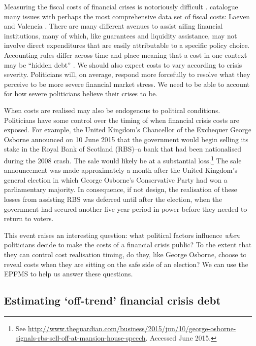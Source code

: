 \documentclass[]{article}
\begin{document}
Measuring the fiscal costs of financial crises is notoriously difficult \citep[see][]{reinhartRogoff2011}. \cite{GandrudHallerberg2015} catalogue many issues with perhaps the most comprehensive data set of fiscal costs: Laeven and Valencia \citeyearpar[and their predecessors]{laeven2013}. There are many different avenues to assist ailing financial institutions, many of which, like guarantees and liquidity assistance, may not involve direct expenditures that are easily attributable to a specific policy choice. Accounting rules differ across time and place \citep{gandrudHallerbergWEP} meaning that a cost in one context may be ``hidden debt'' \citep{reinhartRogoff2011}. We should also expect costs to vary according to crisis severity. Politicians will, on average, respond more forcefully to resolve what they perceive to be more severe financial market stress. We need to be able to account for how severe politicians believe their crises to be.

When costs are realised may also be endogenous to political conditions. Politicians have some control over the timing of when financial crisis costs are exposed. For example, the United Kingdom's Chancellor of the Exchequer George Osborne announced on 10 June 2015 that the government would begin selling its stake in the Royal Bank of Scotland (RBS)--a bank that had been nationalised during the 2008 crash. The sale would likely be at a substantial loss.\footnote{See \url{http://www.theguardian.com/business/2015/jun/10/george-osborne-signals-rbs-sell-off-at-mansion-house-speech}. Accessed June 2015.} The sale announcement was made approximately a month after the United Kingdom's general election in which George Osborne's Conservative Party had won a parliamentary majority. In consequence, if not design, the realisation of these losses from assisting RBS was deferred until after the election, when the government had secured another five year period in power before they needed to return to voters.

This event raises an interesting question: what political factors influence \emph{when} politicians decide to make the costs of a financial crisis public? To the extent that they can control cost realisation timing, do they, like George Osborne, choose to reveal costs when they are sitting on the safe side of an election? We can use the EPFMS to help us answer these questions.

\subsection{Estimating `off-trend' financial crisis debt}
\end{document}
